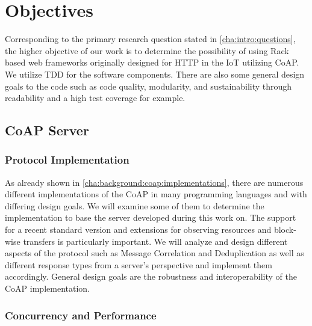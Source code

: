 \chapter{Objectives}
\label{cha:objectives}

Corresponding to the primary research question stated in
\autoref{cha:intro:questions}, the higher objective of our work is to determine
the possibility of using Rack based web frameworks originally designed for
\ac{HTTP} in the \ac{IoT} utilizing \ac{CoAP}. We utilize \acf{TDD} for the
software components. There are also some general design goals to the code such
as code quality, modularity, and sustainability through readability and a high
test coverage for example.

\section{\acs{CoAP} Server}

	\subsection{Protocol Implementation}

		As already shown in \autoref{cha:background:coap:implementations},
		there are numerous different implementations of the \acf{CoAP} in many
		programming languages and with differing design goals. We will examine
		some of them to determine the implementation to base the server
		developed during this work on. The support for a recent standard
		version \cite{coap} and extensions for observing resources
		\cite{observe} and block-wise transfers \cite{block} is particularly
		important. We will analyze and design different aspects of the protocol
		such as Message Correlation and Deduplication as well as different
		response types from a server's perspective and implement them
		accordingly. General design goals are the robustness and
		interoperability of the \ac{CoAP} implementation.

	\subsection{Concurrency and Performance}
	\label{cha:objectives:concurrency}

